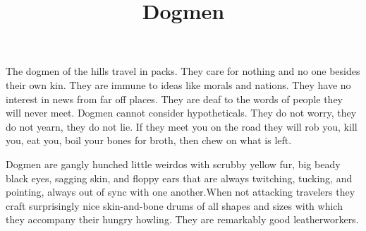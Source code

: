 \documentclass[
  letterpaper,
  DIV=11,
  numbers=noendperiod]{scrartcl}
\title{Dogmen}
\author{}
\date{}
\begin{document}
\maketitle

The dogmen of the hills travel in packs. They care for nothing and no
one besides their own kin. They are immune to ideas like morals and
nations. They have no interest in news from far off places. They are
deaf to the words of people they will never meet. Dogmen cannot consider
hypotheticals. They do not worry, they do not yearn, they do not lie. If
they meet you on the road they will rob you, kill you, eat you, boil
your bones for broth, then chew on what is left.

Dogmen are gangly hunched little weirdos with scrubby yellow fur, big
beady black eyes, sagging skin, and floppy ears that are always
twitching, tucking, and pointing, always out of sync with one
another.When not attacking travelers they craft surprisingly nice
skin-and-bone drums of all shapes and sizes with which they accompany
their hungry howling. They are remarkably good leatherworkers.
\end{document}
